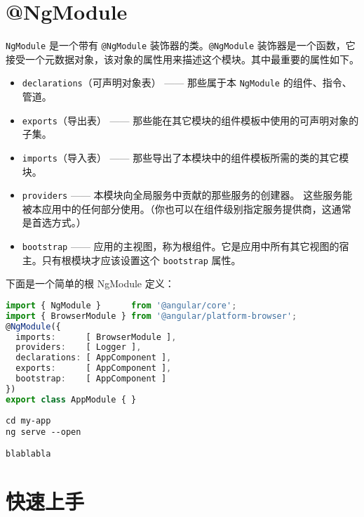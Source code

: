 \documentclass{progartcn}
\begin{document}
\section{\ttfamily @NgModule }

\verb|NgModule| 是一个带有 \verb|@NgModule| 装饰器的类。\verb|@NgModule| 装饰器是一个函数，它接受一个元数据对象，该对象的属性用来描述这个模块。其中最重要的属性如下。

\begin{itemize}
  \item \verb|declarations|（可声明对象表） —— 那些属于本 \verb|NgModule| 的组件、指令、管道。
  
  \item \verb|exports|（导出表） —— 那些能在其它模块的组件模板中使用的可声明对象的子集。
  
  \item \verb|imports|（导入表） —— 那些导出了本模块中的组件模板所需的类的其它模块。
  
  \item \verb|providers| —— 本模块向全局服务中贡献的那些服务的创建器。 这些服务能被本应用中的任何部分使用。（你也可以在组件级别指定服务提供商，这通常是首选方式。）
  
  \item \verb|bootstrap| —— 应用的主视图，称为根组件。它是应用中所有其它视图的宿主。只有根模块才应该设置这个 \verb|bootstrap| 属性。
\end{itemize}


下面是一个简单的根 NgModule 定义：

\begin{lstlisting}[language=TypeScript,caption={src/app/app.module.ts}]
import { NgModule }      from '@angular/core';
import { BrowserModule } from '@angular/platform-browser';
@NgModule({
  imports:      [ BrowserModule ],
  providers:    [ Logger ],
  declarations: [ AppComponent ],
  exports:      [ AppComponent ],
  bootstrap:    [ AppComponent ]
})
export class AppModule { }
\end{lstlisting}

\begin{lstlisting}[style=bashstyle]
cd my-app
ng serve --open
\end{lstlisting}

\begin{lstlisting}[style=bashoutputstyle]
blablabla
\end{lstlisting}

\section{快速上手}
\end{document}
